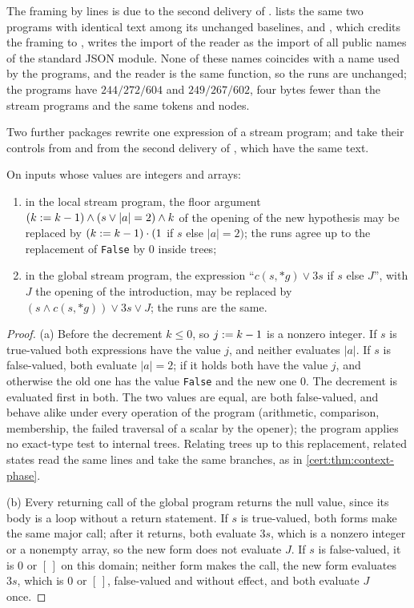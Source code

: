 The framing by lines is due to the second delivery of
.  lists the same two
programs with identical text among its unchanged baselines, and
, which credits the framing to
, writes the import of the reader as the import of
all public names of the standard JSON module. None of these names coincides
with a name used by the programs, and the reader is the same function, so the
runs are unchanged; the programs have $244/272/604$ and $249/267/602$, four
bytes fewer than the stream programs and the same tokens and nodes.

Two further packages rewrite one expression of a stream program;
 and  take their controls from
 and from the second delivery of
, which have the same text.

\begin{proposition}\label{cert:prop:stream-rewrites}
On inputs whose values are integers and arrays:
\begin{enumerate}[label=(\alph*)]
\item in the local stream program, the floor argument
$(k\mathrel{:=} k-1)\land(s\lor\lvert a\rvert=2)\land k$ of the opening of the new
hypothesis may be replaced by $(k\mathrel{:=} k-1)\cdot(1$ if $s$ else
$\lvert a\rvert=2)$; the runs agree up to the replacement of \texttt{False}
by $0$ inside trees;
\item in the global stream program, the expression ``$c(s,{*}g)\lor 3s$ if $s$
else $J$'', with $J$ the opening of the introduction, may be replaced by
$(s\land c(s,{*}g))\lor 3s\lor J$; the runs are the same.
\end{enumerate}
\end{proposition}
\begin{proof}
(a) Before the decrement $k\le 0$, so $j\mathrel{:=} k-1$ is a nonzero integer. If $s$
is true-valued both expressions have the value $j$, and neither evaluates
$\lvert a\rvert$. If $s$ is false-valued, both evaluate $\lvert a\rvert=2$; if it
holds both have the value $j$, and otherwise the old one has the value
\texttt{False} and the new one $0$. The decrement is evaluated first in both. The
two values are equal, are both false-valued, and behave alike under every
operation of the program (arithmetic, comparison, membership, the failed
traversal of a scalar by the opener); the program applies no exact-type test to
internal trees. Relating trees up to this replacement, related states read the
same lines and take the same branches, as in \cref{cert:thm:context-phase}.

(b) Every returning call of the global program returns the null value, since
its body is a loop without a return statement. If $s$ is true-valued, both
forms make the same major call; after it returns, both evaluate $3s$, which is
a nonzero integer or a nonempty array, so the new form does not evaluate $J$.
If $s$ is false-valued, it is $0$ or $[\,]$ on this domain; neither form makes
the call, the new form evaluates $3s$, which is $0$ or $[\,]$, false-valued and
without effect, and both evaluate $J$ once.
\end{proof}

